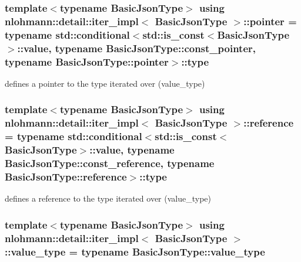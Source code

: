 \subsubsection[{\texorpdfstring{pointer}{pointer}}]{\setlength{\rightskip}{0pt plus 5cm}template$<$typename Basic\+Json\+Type$>$ using {\bf nlohmann\+::detail\+::iter\+\_\+impl}$<$ {\bf Basic\+Json\+Type} $>$\+::{\bf pointer} =  typename std\+::conditional$<$std\+::is\+\_\+const$<${\bf Basic\+Json\+Type}$>$\+::{\bf value}, typename Basic\+Json\+Type\+::const\+\_\+pointer, typename Basic\+Json\+Type\+::pointer$>$\+::type}\hypertarget{classnlohmann_1_1detail_1_1iter__impl_a69e52f890ce8c556fd68ce109e24b360}{}\label{classnlohmann_1_1detail_1_1iter__impl_a69e52f890ce8c556fd68ce109e24b360}


defines a pointer to the type iterated over (value\+\_\+type) 

\subsubsection[{\texorpdfstring{reference}{reference}}]{\setlength{\rightskip}{0pt plus 5cm}template$<$typename Basic\+Json\+Type$>$ using {\bf nlohmann\+::detail\+::iter\+\_\+impl}$<$ {\bf Basic\+Json\+Type} $>$\+::{\bf reference} =  typename std\+::conditional$<$std\+::is\+\_\+const$<${\bf Basic\+Json\+Type}$>$\+::{\bf value}, typename Basic\+Json\+Type\+::const\+\_\+reference, typename Basic\+Json\+Type\+::reference$>$\+::type}\hypertarget{classnlohmann_1_1detail_1_1iter__impl_a5be8001be099c6b82310f4d387b953ce}{}\label{classnlohmann_1_1detail_1_1iter__impl_a5be8001be099c6b82310f4d387b953ce}


defines a reference to the type iterated over (value\+\_\+type) 

\subsubsection[{\texorpdfstring{value\+\_\+type}{value_type}}]{\setlength{\rightskip}{0pt plus 5cm}template$<$typename Basic\+Json\+Type$>$ using {\bf nlohmann\+::detail\+::iter\+\_\+impl}$<$ {\bf Basic\+Json\+Type} $>$\+::{\bf value\+\_\+type} =  typename Basic\+Json\+Type\+::value\+\_\+type}\hypertarget{classnlohmann_1_1detail_1_1iter__impl_ab35586a44f2222272c5346baa3013f67}{}\label{classnlohmann_1_1detail_1_1iter__impl_ab35586a44f2222272c5346baa3013f67}


